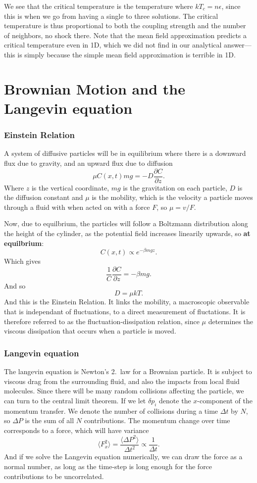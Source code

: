 \documentclass[a4paper, 11pt, notitlepage, english]{article}
\newcommand{\eps}{\epsilon}
\newcommand{\p}{\partial}
\begin{document}
We see that the critical temperature is the temperature where $kT_c = n\eps$, since this is when we go from having a single to three solutions. The critical temperature is thus proportional to both the coupling strength and the number of neighbors, no shock there. Note that the mean field approximation predicts a critical temperature even in 1D, which we did not find in our analytical answer---this is simply because the simple mean field approximation is terrible in 1D.



\clearpage

\section*{Brownian Motion and the Langevin equation}

\subsubsection*{Einstein Relation}
A system of diffusive particles will be in equilibrium where there is a downward flux due to gravity, and an upward flux due to diffusion
$$\mu C(x,t) mg = - D \frac{\p C}{\p z}.$$
Where $z$ is the vertical coordinate, $mg$ is the gravitation on each particle, $D$ is the diffusion constant and $\mu$ is the mobility, which is the velocity a particle moves through a fluid with when acted on with a force $F$, so $\mu = v/F$.

Now, due to equilbrium, the particles will follow a Boltzmann distribution along the height of the cylinder, as the potential field increases linearily upwards, so \textbf{at equilbrium}:
$$C(x, t) \propto e^{-\beta mg z}.$$
Which gives
$$\frac{1}{C} \frac{\p C}{\p z} = -\beta m g.$$
And so
$$D = \mu k T.$$
And this is the Einstein Relation. It links the mobility, a macroscopic observable that is independant of fluctuations, to a direct measurement of fluctations. It is therefore referred to as the fluctuation-dissipation relation, since $\mu$ determines the viscous dissipation that occurs when a particle is moved.

\subsubsection*{Langevin equation}
The langevin equation is Newton's 2.\ law for a Brownian particle. It is subject to viscous drag from the surrounding fluid, and also the impacts from local fluid molecules. Since there will be many random collisions affecting the particle, we can turn to the central limit theorem. If we let $\delta p_i$ denote the $x$-component of the momentum transfer. We denote the number of collisions during a time $\Delta t$ by $N$, so $\Delta P$ is the sum of all $N$ contributions. The momentum change over time corresponds to a force, which will have variance
$$\langle F_x^2 \rangle = \frac{\langle \Delta P^2 \rangle}{\Delta t^2} \propto \frac{1}{\Delta t}.$$
And if we solve the Langevin equation numerically, we can draw the force as a normal number, as long as the time-step is long enough for the force contributions to be uncorrelated.
\end{document}
